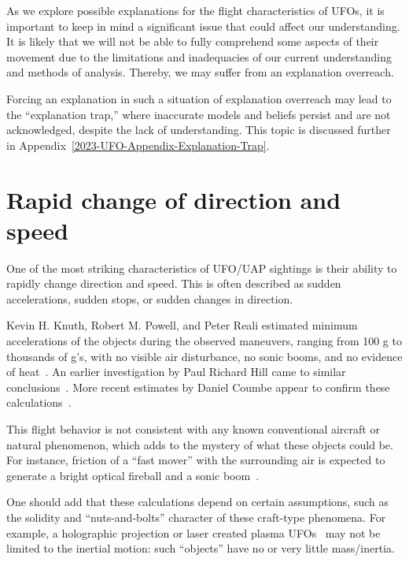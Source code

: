 As we explore possible explanations for the flight characteristics of UFOs, it is important to keep in mind a significant issue that could affect our understanding. It is likely that we will not be able to fully comprehend some aspects of their movement due to the limitations and inadequacies of our current understanding and methods of analysis.
Thereby, we may suffer from an explanation overreach.

Forcing an explanation in such a situation of explanation overreach may lead to the ``explanation trap,''
where inaccurate models and beliefs persist and are not acknowledged, despite the lack of understanding.
This topic is discussed further in Appendix~\ref{2023-UFO-Appendix-Explanation-Trap}.

\section{Rapid change of direction and speed}
\label{2023-UFO-part-Perception-flight-characteristics-rcds}

One of the most striking characteristics of UFO/UAP sightings is their ability
to rapidly change direction and speed. This is often described as sudden accelerations, sudden stops, or sudden changes in direction.

Kevin H. Knuth, Robert M. Powell, and Peter Reali estimated minimum accelerations of the objects during the observed maneuvers, ranging from 100 g to thousands of g's, with no visible air disturbance, no sonic booms, and no evidence of heat~\cite{Knuth-e21100939,NimitzSCURep2019Mar}. An earlier investigation by Paul Richard Hill came to similar conclusions~\cite[pp.~48,49]{Hill2014Jun}.
More recent estimates by Daniel Coumbe appear to confirm these calculations~\cite{Coumbe2022Oct}.

This flight behavior is not consistent with any known conventional aircraft or natural phenomenon,
which adds to the mystery of what these objects could be.
For instance,  friction of a ``fast mover'' with the surrounding air is expected to generate a bright
optical fireball and a sonic boom~\cite{Loeb2022Oct,Loeb2023Mar}.

One should add that these calculations depend on certain assumptions, such as the solidity and ``nuts-and-bolts''
character of these craft-type phenomena.
For example, a holographic projection
or laser created plasma UFOs~\cite{Hambling2020May,Mizokami2020May} may not be limited to the inertial motion:
such ``objects'' have no or very little mass/inertia.

